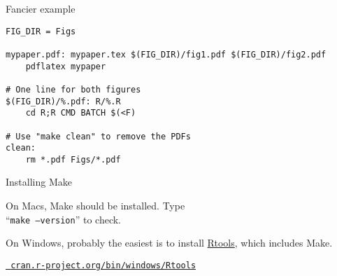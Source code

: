 \documentclass[12pt,t]{beamer}
\begin{document}
\begin{frame}[fragile]{Fancier example}

\begin{semiverbatim}
\begin{lstlisting}
FIG_DIR = Figs

mypaper.pdf: mypaper.tex $(FIG_DIR)/fig1.pdf $(FIG_DIR)/fig2.pdf
    pdflatex mypaper

# One line for both figures
$(FIG_DIR)/%.pdf: R/%.R
    cd R;R CMD BATCH $(<F)

# Use "make clean" to remove the PDFs
clean:
    rm *.pdf Figs/*.pdf
\end{lstlisting}
\end{semiverbatim}

\end{frame}



\begin{frame}[c]{Installing Make}

  \bbi
  \item On Macs, Make should be installed. Type \\
    ``{\tt make --version}''
    to check.

  \item On Windows, probably the easiest is to install
    \href{https://cran.r-project.org/bin/windows/Rtools/}{Rtools},
    which includes Make.
    \bi
    \item[]
      \href{https://cran.r-project.org/bin/windows/Rtools}{\tt
        \footnotesize cran.r-project.org/bin/windows/Rtools}
      \ei
      \ei


\end{frame}
\end{document}
